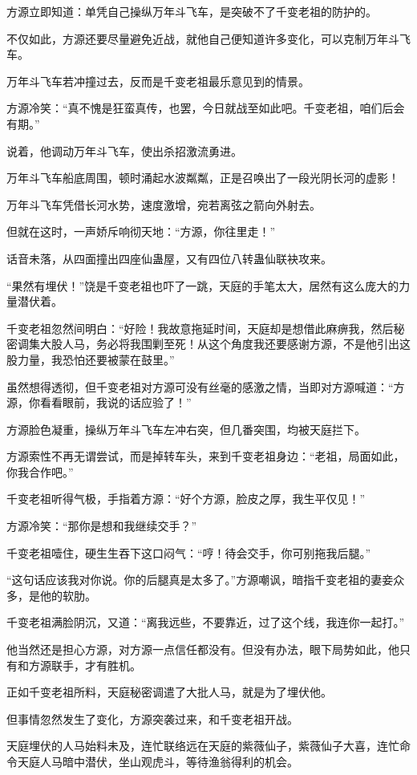 \begin{this_body}
方源立即知道：单凭自己操纵万年斗飞车，是突破不了千变老祖的防护的。

不仅如此，方源还要尽量避免近战，就他自己便知道许多变化，可以克制万年斗飞车。

万年斗飞车若冲撞过去，反而是千变老祖最乐意见到的情景。

方源冷笑：“真不愧是狂蛮真传，也罢，今日就战至如此吧。千变老祖，咱们后会有期。”

说着，他调动万年斗飞车，使出杀招激流勇进。

万年斗飞车船底周围，顿时涌起水波粼粼，正是召唤出了一段光阴长河的虚影！

万年斗飞车凭借长河水势，速度激增，宛若离弦之箭向外射去。

但就在这时，一声娇斥响彻天地：“方源，你往里走！”

话音未落，从四面撞出四座仙蛊屋，又有四位八转蛊仙联袂攻来。

“果然有埋伏！”饶是千变老祖也吓了一跳，天庭的手笔太大，居然有这么庞大的力量潜伏着。

千变老祖忽然间明白：“好险！我故意拖延时间，天庭却是想借此麻痹我，然后秘密调集大股人马，务必将我围剿至死！从这个角度我还要感谢方源，不是他引出这股力量，我恐怕还要被蒙在鼓里。”

虽然想得透彻，但千变老祖对方源可没有丝毫的感激之情，当即对方源喊道：“方源，你看看眼前，我说的话应验了！”

方源脸色凝重，操纵万年斗飞车左冲右突，但几番突围，均被天庭拦下。

方源索性不再无谓尝试，而是掉转车头，来到千变老祖身边：“老祖，局面如此，你我合作吧。”

千变老祖听得气极，手指着方源：“好个方源，脸皮之厚，我生平仅见！”

方源冷笑：“那你是想和我继续交手？”

千变老祖噎住，硬生生吞下这口闷气：“哼！待会交手，你可别拖我后腿。”

“这句话应该我对你说。你的后腿真是太多了。”方源嘲讽，暗指千变老祖的妻妾众多，是他的软肋。

千变老祖满脸阴沉，又道：“离我远些，不要靠近，过了这个线，我连你一起打。”

他当然还是担心方源，对方源一点信任都没有。但没有办法，眼下局势如此，他只有和方源联手，才有胜机。

正如千变老祖所料，天庭秘密调遣了大批人马，就是为了埋伏他。

但事情忽然发生了变化，方源突袭过来，和千变老祖开战。

天庭埋伏的人马始料未及，连忙联络远在天庭的紫薇仙子，紫薇仙子大喜，连忙命令天庭人马暗中潜伏，坐山观虎斗，等待渔翁得利的机会。


\end{this_body}
